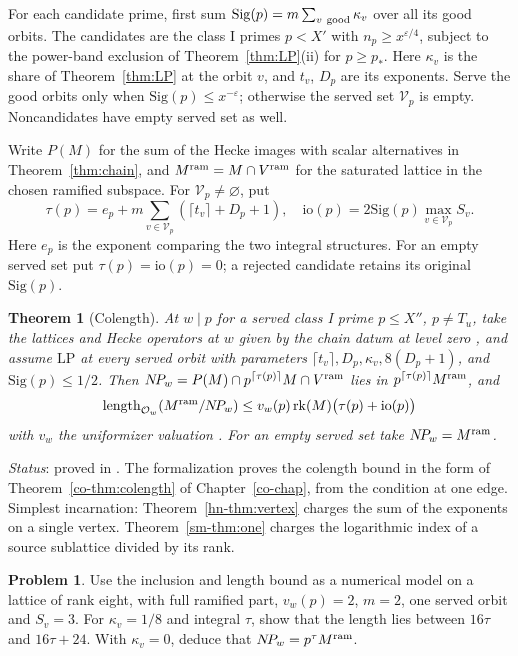 \documentclass[reqno]{amsart}
\newcounter{chap}
\theoremstyle{definition}
\newtheorem{problem}{Problem}[section]
\theoremstyle{plain}
\newtheorem{theorem}{Theorem}[section]
\newcommand{\Oc}{\mathcal O}
\newcommand{\Sig}{\mathrm{Sig}}
\newcommand{\io}{\mathrm{io}}
\newcommand{\LP}{\mathrm{LP}}
\begin{document}
For each candidate prime, first sum \(\Sig(p)=m\sum_{v\ {\rm good}}\kappa_v\) over all its good orbits. The candidates are the class I primes \(p<X'\) with \(n_p\ge x^{\varepsilon/4}\), subject to the power-band exclusion of Theorem~\ref{thm:LP}(ii) for \(p\ge p_*\).  Here \(\kappa_v\) is the share of Theorem~\ref{thm:LP} at the orbit \(v\), and \(t_v\), \(D_p\) are its exponents.  Serve the good orbits only when \(\Sig(p)\le x^{-\varepsilon}\); otherwise the served set \(\mathcal V_p\) is empty. Noncandidates have empty served set as well.

Write \(P(M)\) for the sum of the Hecke images with scalar alternatives in Theorem~\ref{thm:chain}, and \(M^{\rm ram}=M\cap V^{\rm ram}\) for the saturated lattice in the chosen ramified subspace. For \(\mathcal V_p\ne\varnothing\), put
\[
 \tau(p)=e_p+m\sum_{v\in\mathcal V_p}(\lceil t_v\rceil+D_p+1),\quad
 \io(p)=2\Sig(p)\max_{v\in\mathcal V_p} S_v .
\]
Here \(e_p\) is the exponent comparing the two integral structures. For an empty served set put \(\tau(p)=\io(p)=0\); a rejected candidate retains its original \(\Sig(p)\).

\begin{theorem}[Colength]\label{thm:colength}
At \(w\mid p\) for a served class I prime \(p\le X''\), \(p\ne T_u\), take the lattices and Hecke operators at \(w\) given by the chain datum at level zero \cite[\S12.3, (F1)--(F5)]{Adr}, and assume \(\LP\) at every served orbit with parameters \(\lceil t_v\rceil,D_p,\kappa_v,8(D_p+1)\), and \(\Sig(p)\le1/2\).
Then \(N\!P_w=P(M)\cap p^{\lceil\tau(p)\rceil}M\cap V^{\rm ram}\) lies in \(p^{\lceil\tau(p)\rceil}M^{\rm ram}\), and
\[
 \operatorname{length}_{\Oc_w}(M^{\rm ram}/N\!P_w)
 \le v_w(p)\operatorname{rk}(M)\big(\tau(p)+\io(p)\big)
\]
with \(v_w\) the uniformizer valuation \cite[Thm.~12.18]{Adr}. For an empty served set take \(N\!P_w=M^{\rm ram}\).
\end{theorem}
\noindent \emph{Status}: proved in \cite{Adr}.  The formalization proves the colength bound in the form of Theorem~\ref{co-thm:colength} of Chapter~\ref{co-chap}, from the condition at one edge.  Simplest incarnation: Theorem~\ref{hn-thm:vertex} charges the sum of the exponents on a single vertex. Theorem~\ref{sm-thm:one} charges the logarithmic index of a source sublattice divided by its rank.
\begin{problem}\label{pr:share}
Use the inclusion and length bound as a numerical model on a lattice of rank eight, with full ramified part, \(v_w(p)=2\), \(m=2\), one served orbit and \(S_v=3\). For \(\kappa_v=1/8\) and integral \(\tau\), show that the length lies between \(16\tau\) and \(16\tau+24\). With \(\kappa_v=0\), deduce that \(N\!P_w=p^\tau M^{\rm ram}\).
\end{problem}
\end{document}
